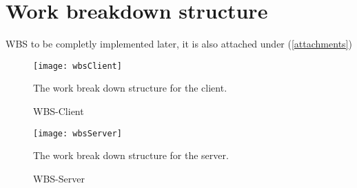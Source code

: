 \section{Work breakdown structure}\label{WBS}
    WBS to be completly implemented later, it is also attached under (\ref{attachments})
    
        \begin{figure}[htb]
            \centering
            \texttt{[image: wbsClient]}
            \caption{WBS-Client}
            The work break down structure for the client.
            \label{fig:wbsClient}
        \end{figure}
        
        \begin{figure}[hbt]
            \centering
            \texttt{[image: wbsServer]}
            \caption{WBS-Server}
            The work break down structure for the server.
            \label{fig:wbdServer}
        \end{figure}
